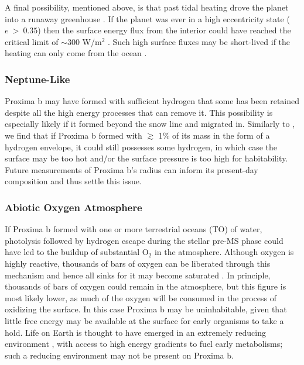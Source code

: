 \documentclass[preprint,12pt]{aastex}
\begin{document}
A final possibility, mentioned above, is that past tidal heating drove
the planet into a runaway greenhouse \citep{Barnes13}. If the planet
was ever in a high eccentricity state ($e~>~0.35$) then the surface
energy flux from the interior could have reached the critical limit of
$\sim$300 W/m$^2$ \citep{Kasting93,Abe93,Goldblatt15}. Such high
surface fluxes may be short-lived if the heating can only come from
the ocean \citep{DriscollBarnes15}.

\subsubsection{Neptune-Like}
\label{sec:results:atmstates:neptunelike}

Proxima b may have formed with sufficient hydrogen that some has been
retained despite all the high energy processes that can remove
it. This possibility is especially likely if it formed beyond the snow
line and migrated in. Similarly to \cite{OwenMohanty16}, we find that
if Proxima b formed with $\gtrsim$ 1\% of its mass in the form of a
hydrogen envelope, it could still possesses some hydrogen, in which
case the surface may be too hot and/or the surface pressure is too
high for habitability.  Future measurements of Proxima b's radius can
inform its present-day composition and thus settle this issue.

\subsubsection{Abiotic Oxygen Atmosphere}
\label{sec:results:atmstates:o2atmos}

If Proxima b formed with one or more terrestrial oceans (TO) of water, photolysis followed
by hydrogen escape during the stellar pre-MS phase could have led to
the buildup of substantial O$_2$ in the atmosphere. Although oxygen is
highly reactive, thousands of bars of oxygen can be liberated through
this mechanism \citep{LugerBarnes15} and hence all sinks for it may
become saturated \citep{Schaefer16}. In principle, thousands of bars
of oxygen could remain in the atmosphere, but this figure is most
likely lower, as much of the oxygen will be consumed in the process of
oxidizing the surface.  In this case Proxima b may be uninhabitable,
given that little free energy may be available at the surface for
early organisms to take a hold. Life on Earth is thought to have
emerged in an extremely reducing environment \citep{Oparin24,
  Haldane29}, with access to high energy gradients to fuel early
metabolisms; such a reducing environment may not be present on Proxima b.
\end{document}
